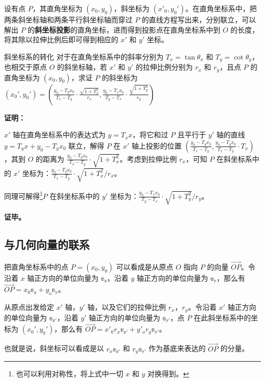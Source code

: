 设有点 $P$，其直角坐标为 $(x_0, y_0)$，斜坐标为 $(x'_0, y_0')$。在直角坐标系中，把两条斜坐标轴和两条平行斜坐标轴而穿过 $P$ 的直线方程写出来，分别联立，可以解出 $P$ 的\textbf{斜坐标投影}的直角坐标，进而得到投影点在直角坐标系中到 $O$ 的长度，将其除以拉伸比例后即可得到相应的 $x'$ 和 $y'$ 坐标。

\begin{example}{斜坐标系的转化}
对于在直角坐标系中的斜率分别为 $T_x=\tan{\theta_x}$ 和 $T_y=\cot{\theta_y}$，也相交于原点 $O$ 的斜坐标轴，若 $x'$ 和 $y'$ 的拉伸比例分别为 $r_x$ 和 $r_y$，且点 $P$ 的直角坐标为 $(x_0, y_0)$，求证 $P$ 的斜坐标为 $(x_0', y_0')=(\frac{y_0-T_yx_0}{T_x-T_y}\cdot\frac{\sqrt{1+T_x^2}}{r_x}, \frac{y_0-T_xx_0}{T_y-T_x}\cdot\frac{\sqrt{1+T_y^2}}{r_y})$
\end{example}

\textbf{证明：}

$x'$ 轴在直角坐标系中的表达式为 $y=T_xx$，将它和过 $P$ 且平行于 $y'$ 轴的直线 $y=T_yx+y_0-T_yx_0$ 联立，解得 $P$ 在 $x'$ 轴上投影的位置 $(\frac{y_0-T_yx_0}{T_x-T_y}, \frac{y_0-T_yx_0}{T_x-T_y}\cdot T_x)$，其到 $O$ 的距离为 $\frac{y_0-T_yx_0}{T_x-T_y}\cdot\sqrt{1+T_x^2}$。考虑到拉伸比例 $r_x$，可知 $P$ 在斜坐标系中的 $x'$ 坐标为：$\frac{y_0-T_yx_0}{T_x-T_y}\cdot\sqrt{1+T_x^2}/r_x$。

同理可解得\footnote{也可以利用对称性，将上式中一切 $x$ 和 $y$ 对换得到。}$P$ 在斜坐标系中的 $y'$ 坐标为：$\frac{y_0-T_xx_0}{T_y-T_x}\cdot\sqrt{1+T_y^2}/r_y$。

\textbf{证毕。}

\subsection{与几何向量的联系}

把直角坐标系中的点 $P=(x_0, y_0)$ 可以看成是从原点 $O$ 指向 $P$ 的向量 $\overrightarrow{OP}$。令沿着 $x$ 轴正方向的单位向量为 $\mathbb{e_x}$，沿着 $y$ 轴正方向的单位向量为 $\mathbb{e_y}$，那么有 $\overrightarrow{OP}=x_0\mathbb{e_x}+y_o\mathbb{e_y}$。

从原点出发给定 $x'$ 轴，$y'$ 轴，以及它们的拉伸比例 $r_x$，$r_y$。令沿着 $x'$ 轴正方向的单位向量为 $\mathbb{e_{x'}}$，沿着 $y'$ 轴正方向的单位向量为 $\mathbb{e_{y'}}$，点 $P$ 在此斜坐标系中的坐标为 $(x_0',y_0')$，那么有 $\overrightarrow{OP}=x'_0r_x\mathbb{e_{x'}}+y'_or_y\mathbb{e_{y'}}$。

也就是说，斜坐标可以看成是以 $r_x\mathbb{e_{x'}}$ 和 $r_y\mathbb{e_{y'}}$ 作为基底来表达的 $\overrightarrow{OP}$ 的分量。




